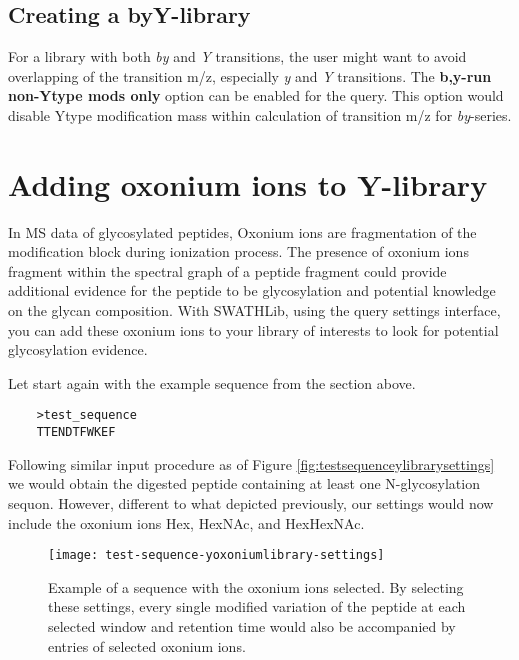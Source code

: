 \documentclass[../manual.tex]{subfiles}
\begin{document}
\subsection{Creating a byY-library}
For a library with both \emph{by} and \emph{Y} transitions, the user might want to avoid overlapping of the transition m/z, especially \emph{y} and \emph{Y} transitions. The \textbf{b,y-run non-Ytype mods only} option can be enabled for the query. This option would disable Ytype modification mass within calculation of transition m/z for \emph{by}-series.

\section{Adding oxonium ions to Y-library}
In MS data of glycosylated peptides, Oxonium ions are fragmentation of the modification block during ionization process. The presence of oxonium ions fragment within the spectral graph of a peptide fragment could provide additional evidence for the peptide to be glycosylation and potential knowledge on the glycan composition. With SWATHLib, using the query settings interface, you can add these oxonium ions to your library of interests to look for potential glycosylation evidence.\par

Let start again with the example sequence from the section above.\par
\begin{verbatim}
	>test_sequence
	TTENDTFWKEF
\end{verbatim}

Following similar input procedure as of Figure \ref{fig:testsequenceylibrarysettings} we would obtain the digested peptide containing at least one N-glycosylation sequon. However, different to what depicted previously, our settings would now include the oxonium ions Hex, HexNAc, and HexHexNAc.\par

\begin{figure}[H]
	\centering
	\begin{framed}
        \centering
        \begin{adjustbox}{width=1\textwidth}
			\texttt{[image: test-sequence-yoxoniumlibrary-settings]}
		\end{adjustbox}
		\caption{Example of a sequence with the oxonium ions selected. By selecting these settings, every single modified variation of the peptide at each selected window and retention time would also be accompanied by entries of selected oxonium ions.}\label{fig:testsequenceyoxoniumlibrarysettings}
	\end{framed}
\end{figure}
\end{document}
